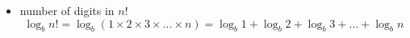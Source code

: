 \begin{itemize}
  \item number of digits in $n!$
  $$ \log _{b} n! = \log _{b} (1 \times 2 \times 3 \times ... \times n) = \log _{b} 1 + \log _{b} 2 + \log _{b} 3 + ... + \log _{b} n $$
\end{itemize}
